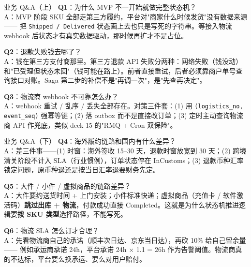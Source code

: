 \begin{frame}{业务 Q\&A（上）}
\textbf{Q1}：为什么 MVP 不一开始就做完整状态机？\\
\hspace{4mm}\small A：MVP 阶段 SKU 全部走第三方履约，平台对"商家什么时候发货"没有数据来源 —— 把 \texttt{Shipped / Delivered} 状态画上去也只是写死的字符串。等接入物流 webhook 后状态才有真实数据驱动，那时候再扩才不是占位。

\vspace{2mm}
\textbf{Q2}：退款失败钱去哪了？\\
\hspace{4mm}\small A：钱在第三方支付商那里。第三方退款 API 失败分两种：网络失败（钱没动）和"已受理但状态未回"（钱可能在路上）。前者直接重试，后者必须靠商户单号查询接口对账。Saga 第二步的补偿不是"再调一次"，是"先查再决定"。

\vspace{2mm}
\textbf{Q3}：物流商 webhook 不可靠怎么办？\\
\hspace{4mm}\small A：webhook 重试 / 乱序 / 丢失全部存在。对策三件套：(1) 用 \texttt{(logistics\_no, event\_seq)} 强幂等键；(2) 落 outbox 而不是直接改订单；(3) 定时主动查询物流商 API 作兜底，类似 deck 15 的"RMQ + Cron 双保险"。
\end{frame}

\begin{frame}{业务 Q\&A（下）}
\textbf{Q4}：海外履约链路和国内有什么差异？\\
\hspace{4mm}\small A：差三件事——(1) 时窗：海外签收 15--30 天，退款时窗放宽到 30 天；(2) 跨境清关阶段不计入 SLA（行业惯例），订单状态停在 InCustoms；(3) 退款币种汇率锁定问题，原币种退还是按当日汇率退要财务先定。

\vspace{2mm}
\textbf{Q5}：大件 / 小件 / 虚拟商品的链路差异？\\
\hspace{4mm}\small A：大件要约送货时间 + 上门安装；小件标准快递；虚拟商品（充值卡 / 软件激活码）\textbf{跳过出库 + 物流}，付款成功直接 Completed。这就是为什么状态机推进逻辑要\textbf{按 SKU 类型}选择路径，不能写死。

\vspace{2mm}
\textbf{Q6}：物流 SLA 怎么订才合理？\\
\hspace{4mm}\small A：先看物流商自己的承诺（顺丰次日达、京东当日达），再砍 10\% 给自己留余量 —— 例如承运商承诺 24h，平台承诺 24h $\times$ 1.1 = 26h 作为告警阈值。物流商真的不达标，平台要么换承运、要么对用户赔付。
\end{frame}

